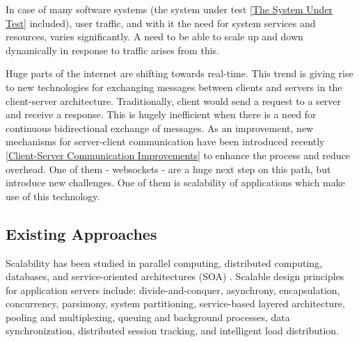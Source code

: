 \documentclass{uvamscse}
\begin{document}
In case of many software systems (the system under test \ref{The System Under Test} included), user traffic, and with it the need for system services and resources, varies significantly. A need to be able to scale up and down dynamically in response to traffic arises from this.

Huge parts of the internet are shifting towards real-time. This trend is giving rise to new technologies for exchanging messages between clients and servers in the client-server architecture. Traditionally, client would send a request to a server and receive a response. This is hugely inefficient when there is a need for continuous bidirectional exchange of messages. As an improvement, new mechanisms for server-client communication have been introduced recently \ref{Client-Server Communication Improvements} to enhance the process and reduce overhead. One of them - websockets - are a huge next step on this path, but introduce new challenges. One of them is scalability of applications which make use of this technology.

\subsection{Existing Approaches}
Scalability has been studied in parallel computing, distributed computing, databases, and service-oriented architectures (SOA) \cite{WeiTek}. Scalable design principles for application servers include: divide-and-conquer, asynchrony, encapsulation, concurrency, parsimony, system partitioning, service-based layered architecture, pooling and multiplexing, queuing and background processes, data synchronization, distributed session tracking, and intelligent load distribution.
\end{document}
